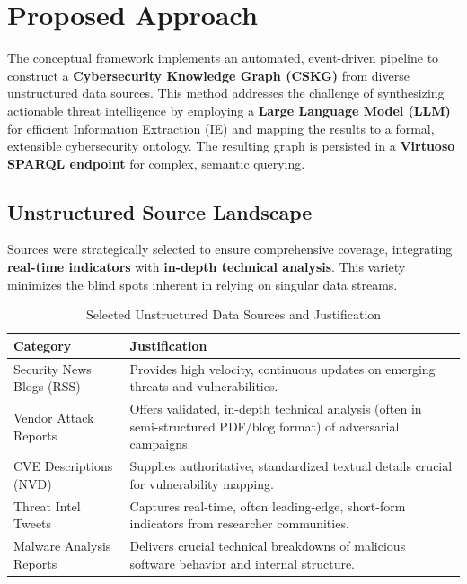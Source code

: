 \section{Proposed Approach}
The conceptual framework implements an automated, event-driven pipeline to construct a \textbf{Cybersecurity Knowledge Graph (CSKG)} from diverse unstructured data sources. This method addresses the challenge of synthesizing actionable threat intelligence by employing a \textbf{Large Language Model (LLM)} for efficient Information Extraction (IE) and mapping the results to a formal, extensible cybersecurity ontology. The resulting graph is persisted in a \textbf{Virtuoso SPARQL endpoint} for complex, semantic querying.

\subsection{Unstructured Source Landscape}
Sources were strategically selected to ensure comprehensive coverage, integrating \textbf{real-time indicators} with \textbf{in-depth technical analysis}. This variety minimizes the blind spots inherent in relying on singular data streams.

\begin{table}[h]
\centering
\caption{Selected Unstructured Data Sources and Justification}
\label{tab:sources}
\begin{tabular}{l p{7cm}} 
\toprule
\textbf{Category} & \textbf{Justification} \\
\midrule
Security News Blogs (RSS) & Provides high velocity, continuous updates on emerging threats and vulnerabilities. \\
Vendor Attack Reports & Offers validated, in-depth technical analysis (often in semi-structured PDF/blog format) of adversarial campaigns. \\
CVE Descriptions (NVD) & Supplies authoritative, standardized textual details crucial for vulnerability mapping. \\
Threat Intel Tweets & Captures real-time, often leading-edge, short-form indicators from researcher communities. \\
Malware Analysis Reports & Delivers crucial technical breakdowns of malicious software behavior and internal structure. \\
\bottomrule
\end{tabular}
\end{table}

